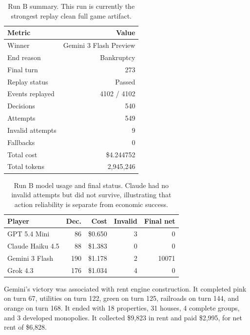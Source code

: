 \documentclass[conference]{IEEEtran}
\begin{document}
\begin{table}[t]
\caption{Run B summary. This run is currently the strongest replay clean full game artifact.}
\label{tab:run_b_summary}
\centering
\begin{tabular}{lr}
\toprule
\textbf{Metric} & \textbf{Value} \\
\midrule
Winner & Gemini 3 Flash Preview \\
End reason & Bankruptcy \\
Final turn & 273 \\
Replay status & Passed \\
Events replayed & 4102 / 4102 \\
Decisions & 540 \\
Attempts & 549 \\
Invalid attempts & 9 \\
Fallbacks & 0 \\
Total cost & \$4.244752 \\
Total tokens & 2,945,246 \\
\bottomrule
\end{tabular}
\end{table}

\begin{table}[t]
\caption{Run B model usage and final status. Claude had no invalid attempts but did not survive, illustrating that action reliability is separate from economic success.}
\label{tab:run_b_usage}
\centering
\begin{tabular}{lrrrr}
\toprule
\textbf{Player} & \textbf{Dec.} & \textbf{Cost} & \textbf{Invalid} & \textbf{Final net} \\
\midrule
GPT 5.4 Mini & 86 & \$0.650 & 3 & 0 \\
Claude Haiku 4.5 & 88 & \$1.383 & 0 & 0 \\
Gemini 3 Flash & 190 & \$1.178 & 2 & 10071 \\
Grok 4.3 & 176 & \$1.034 & 4 & 0 \\
\bottomrule
\end{tabular}
\end{table}

Gemini's victory was associated with rent engine construction. It completed pink on turn 67, utilities on turn 122, green on turn 125, railroads on turn 144, and orange on turn 168. It ended with 18 properties, 31 houses, 4 complete groups, and 3 developed monopolies. It collected \$9,823 in rent and paid \$2,995, for net rent of \$6,828.
\end{document}
